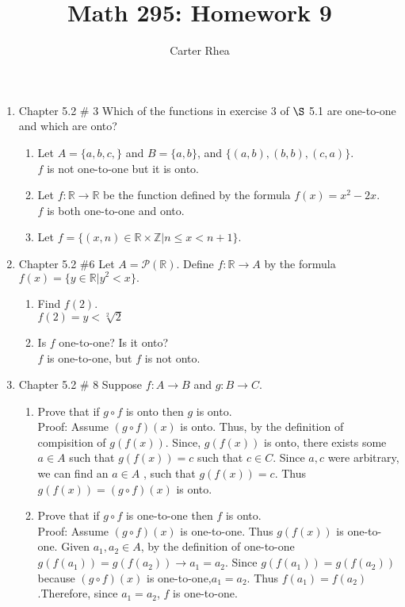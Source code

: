 \documentclass[10pt,a4paper]{article}
\author{Carter Rhea}
\title{Math 295: Homework 9}
\begin{document}
\maketitle
\begin{enumerate}
\item Chapter 5.2 $\#$ 3 Which of the functions in exercise 3 of $\S$ 5.1 are one-to-one and which are onto?\\
\begin{enumerate}
\item Let $A=\{a,b,c,\}$ and $B=\{a,b\}$, and $\{(a,b),(b,b),(c,a)\}$.\\
$f$ is not one-to-one but it is onto.
\item Let $f : \mathbb{R} \to \mathbb{R}$ be the function defined by the formula $f(x)= x^2 - 2x$.\\
$f$ is both one-to-one and onto.
\item Let $f= \{(x,n) \in \mathbb{R} \times \mathbb{Z} | n \leq x < n+1 \}$.\\
\end{enumerate}
\item Chapter 5.2 \#6 Let $A = \mathcal{P}(\mathbb{R})$. Define $f : \mathbb{R} \to A$ by the formula $f(x) = \{y \in \mathbb{R} | y^2 <x  \}.$
\begin{enumerate}
\item Find $f(2)$.\\
$f(2) = y< \sqrt[2]{2}$
\item Is $f$ one-to-one? Is it onto?\\
$f$ is one-to-one, but $f$ is not onto.
\end{enumerate}
\item Chapter 5.2 \# 8 Suppose $f : A \to B$ and $g : B \to C$. 
\begin{enumerate}
\item Prove that if $g \circ f$ is onto then $g$ is onto.\\
Proof: Assume $(g \circ f)(x)$ is onto. Thus, by the definition of compisition of $g(f(x))$. Since, $g(f(x))$ is onto, there exists some $a \in A$ such that $g(f(x))=c$ such that $c \in C$. Since $a,c$ were arbitrary, we can find an $a \in A$ , such that $g(f(x)) =c$. Thus $g(f(x))=(g \circ f)(x)$ is onto.
\item Prove that if $g \circ f$ is one-to-one then $f$ is onto.\\
Proof: Assume $(g \circ f)(x)$ is one-to-one. Thus $g(f(x))$ is one-to-one. Given $a_1 , a_2 \in A$, by the definition of one-to-one $g(f(a_1))=g(f(a_2)) \to a_1 = a_2$. Since $ g(f(a_1))=g(f(a_2))$ because $( g \circ f)(x)$ is one-to-one,$ a_1=a_2$. Thus $f(a_1)=f(a_2)$.Therefore, since $a_1=a_2$, $f$ is one-to-one. 

\end{enumerate}
\end{enumerate}
\end{document}
